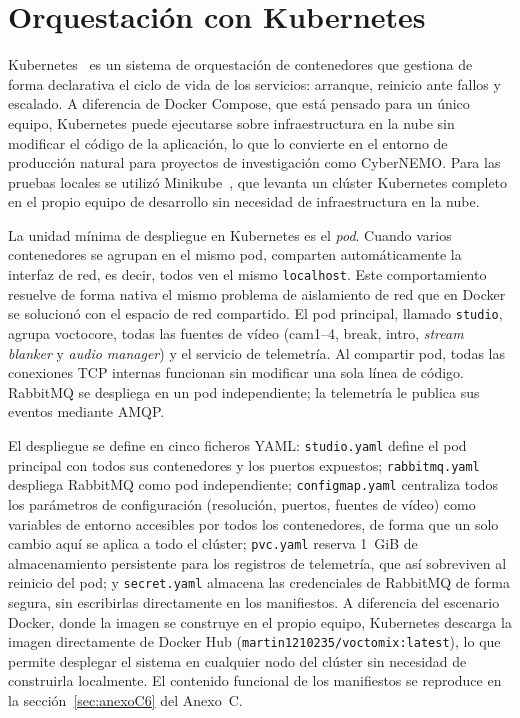 \section{Orquestación con Kubernetes}
\label{sec:kubernetes}

Kubernetes~\cite{kubernetes_burns2016} es un sistema de orquestación de contenedores que gestiona de forma
declarativa el ciclo de vida de los servicios: arranque, reinicio ante fallos y escalado.
A diferencia de Docker Compose, que está pensado para un único equipo, Kubernetes puede
ejecutarse sobre infraestructura en la nube sin modificar el código de la aplicación,
lo que lo convierte en el entorno de producción natural para proyectos de investigación
como CyberNEMO. Para las pruebas locales se utilizó Minikube~\cite{minikube_docs}, que levanta un
clúster Kubernetes completo en el propio equipo de desarrollo sin necesidad de
infraestructura en la nube.

La unidad mínima de despliegue en Kubernetes es el \textit{pod}. Cuando varios contenedores
se agrupan en el mismo pod, comparten automáticamente la interfaz de red, es decir, todos
ven el mismo \texttt{localhost}. Este comportamiento resuelve de forma nativa el mismo
problema de aislamiento de red que en Docker se solucionó con el espacio de red compartido.
El pod principal, llamado \texttt{studio}, agrupa voctocore, todas las fuentes de vídeo
(cam1--4, break, intro, \textit{stream blanker} y \textit{audio manager}) y el servicio de telemetría. Al compartir pod, todas las conexiones
TCP internas funcionan sin modificar una sola línea de código. RabbitMQ se despliega en un
pod independiente; la telemetría le publica sus eventos mediante \acs{AMQP}.

El despliegue se define en cinco ficheros \ac{YAML}:
\texttt{studio.yaml} define el pod principal con todos sus contenedores y los puertos
expuestos; \texttt{rabbitmq.yaml} despliega RabbitMQ como pod independiente;
\texttt{configmap.yaml} centraliza todos los parámetros de configuración (resolución,
puertos, fuentes de vídeo) como variables de entorno accesibles por todos los contenedores,
de forma que un solo cambio aquí se aplica a todo el clúster; \texttt{pvc.yaml} reserva
1~GiB de almacenamiento persistente para los registros de telemetría, que así sobreviven
al reinicio del pod; y \texttt{secret.yaml} almacena las credenciales de RabbitMQ de
forma segura, sin escribirlas directamente en los manifiestos. A diferencia del escenario
Docker, donde la imagen se construye en el propio equipo, Kubernetes descarga la imagen
directamente de Docker Hub (\texttt{martin1210235/voctomix:latest}), lo que permite
desplegar el sistema en cualquier nodo del clúster sin necesidad de construirla localmente.
El contenido funcional de los manifiestos se reproduce en la sección~\ref{sec:anexoC6} del Anexo~C.

